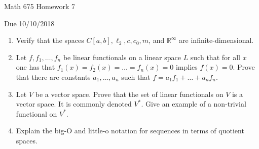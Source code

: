 \documentclass[12pt,letterpaper,reqno]{amsart}
\newcommand{\R}{\mathbb R}
\begin{document}
\thispagestyle{empty}
\centerline{\Large Math 675 Homework 7}
\centerline{Due 10/10/2018}
\vspace{.25in}

\begin{enumerate}[1.]
\item Verify that the spaces $C[a,b], \ell_2, c, c_0, m$, and $\R^\infty$ are infinite-dimensional.
\item Let $f, f_1, \ldots, f_n$ be linear functionals on a linear space $L$ such that for all $x$ one has that $f_1(x)=f_2(x)=\ldots=f_n(x)=0$ implies $f(x)=0$. Prove that there are constants $a_1, \ldots, a_n$ such that $f=a_1f_1+\ldots+a_nf_n$.
\item Let $V$ be a vector space. Prove that the set of linear functionals on $V$ is a vector space. It is commonly denoted $V^*$.  Give an example of a non-trivial functional on $V^*$.
\item Explain the big-O and little-o notation for sequences in terms of quotient spaces.
\end{enumerate}
\end{document}
